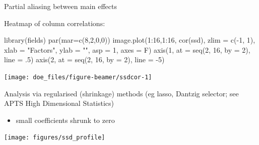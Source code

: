 \documentclass[
  ignorenonframetext,
]{beamer}
\newenvironment{Shaded}{\begin{snugshade}}{\end{snugshade}}
\newcommand{\AttributeTok}[1]{\textcolor[rgb]{0.77,0.63,0.00}{#1}}
\newcommand{\DecValTok}[1]{\textcolor[rgb]{0.00,0.00,0.81}{#1}}
\newcommand{\FunctionTok}[1]{\textcolor[rgb]{0.00,0.00,0.00}{#1}}
\newcommand{\NormalTok}[1]{#1}
\newcommand{\SpecialCharTok}[1]{\textcolor[rgb]{0.00,0.00,0.00}{#1}}
\newcommand{\StringTok}[1]{\textcolor[rgb]{0.31,0.60,0.02}{#1}}
\providecommand{\tightlist}{%
  \setlength{\itemsep}{0pt}\setlength{\parskip}{0pt}}
\begin{document}
\begin{frame}[fragile]{}
\protect\hypertarget{section-19}{}
Partial aliasing between main effects

Heatmap of column correlations:

\begin{Shaded}
\begin{Highlighting}[]
\FunctionTok{library}\NormalTok{(fields)}
\FunctionTok{par}\NormalTok{(}\AttributeTok{mar=}\FunctionTok{c}\NormalTok{(}\DecValTok{8}\NormalTok{,}\DecValTok{2}\NormalTok{,}\DecValTok{0}\NormalTok{,}\DecValTok{0}\NormalTok{))}
\FunctionTok{image.plot}\NormalTok{(}\DecValTok{1}\SpecialCharTok{:}\DecValTok{16}\NormalTok{,}\DecValTok{1}\SpecialCharTok{:}\DecValTok{16}\NormalTok{, }\FunctionTok{cor}\NormalTok{(ssd), }\AttributeTok{zlim =} \FunctionTok{c}\NormalTok{(}\SpecialCharTok{{-}}\DecValTok{1}\NormalTok{, }\DecValTok{1}\NormalTok{), }\AttributeTok{xlab =} \StringTok{"Factors"}\NormalTok{, }
           \AttributeTok{ylab =} \StringTok{""}\NormalTok{, }\AttributeTok{asp =} \DecValTok{1}\NormalTok{, }\AttributeTok{axes =}\NormalTok{ F)}
\FunctionTok{axis}\NormalTok{(}\DecValTok{1}\NormalTok{, }\AttributeTok{at =} \FunctionTok{seq}\NormalTok{(}\DecValTok{2}\NormalTok{, }\DecValTok{16}\NormalTok{, }\AttributeTok{by =} \DecValTok{2}\NormalTok{), }\AttributeTok{line =}\NormalTok{ .}\DecValTok{5}\NormalTok{)}
\FunctionTok{axis}\NormalTok{(}\DecValTok{2}\NormalTok{, }\AttributeTok{at =} \FunctionTok{seq}\NormalTok{(}\DecValTok{2}\NormalTok{, }\DecValTok{16}\NormalTok{, }\AttributeTok{by =} \DecValTok{2}\NormalTok{), }\AttributeTok{line =} \SpecialCharTok{{-}}\DecValTok{5}\NormalTok{)}
\end{Highlighting}
\end{Shaded}

\begin{center}\texttt{[image: doe\_files/figure-beamer/ssdcor-1]} \end{center}
\end{frame}

\begin{frame}{}
\protect\hypertarget{section-20}{}
Analysis via regularised (shrinkage) methods (eg lasso, Dantzig
selector; see APTS High Dimensional Statistics)

\begin{itemize}
\tightlist
\item
  small coefficients shrunk to zero
\end{itemize}

\begin{center}\texttt{[image: figures/ssd\_profile]} \end{center}
\end{frame}
\end{document}
